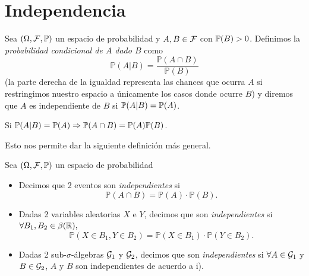 \section{Independencia}

Sea $(\Omega, \mathcal{F}, \mathbb{P})$ un espacio de probabilidad y $A,B \in \mathcal{F}$ con $\mathbb{P}(B) > 0$. Definimos la \textit{probabilidad condicional de $A$ dado $B$} como
\[ \mathbb{P}(A | B) = \frac{\mathbb{P}(A \cap B)}{\mathbb{P}(B)} \]
(la parte derecha de la igualdad representa las chances que ocurra $A$ si restringimos nuestro espacio a únicamente los casos donde ocurre $B$) y diremos que $A$ es independiente de $B$ si $\mathbb{P}(A | B) = \mathbb{P}(A)$.

\begin{remark}
	Si $\mathbb{P}(A | B) = \mathbb{P}(A) \Rightarrow \mathbb{P}(A \cap B) = \mathbb{P}(A) \mathbb{P}(B)$.
\end{remark}

Esto nos permite dar la siguiente definición más general.

\begin{definition}
	Sea $(\Omega, \mathcal{F}, \mathbb{P})$ un espacio de probabilidad
	\begin{itemize}
		\item Decimos que 2 eventos son \textit{independientes} si
		\[ \mathbb{P}(A \cap B) = \mathbb{P}(A) \cdot \mathbb{P}(B). \]

		\item Dadas 2 variables aleatorias $X$ e $Y$, decimos que son \textit{independientes} si $\forall B_{1}, B_{2} \in \beta(\mathbb{R}),$
		\[ \mathbb{P}(X \in B_{1}, Y \in B_{2}) = \mathbb{P}(X \in B_{1}) \cdot \mathbb{P}(Y \in B_{2}). \]
		
		\item Dadas 2 sub-$\sigma$-álgebras $\mathcal{G}_{1}$ y $\mathcal{G}_{2}$, decimos que son \textit{independientes} si $\forall A \in \mathcal{G}_{1}$ y $B \in \mathcal{G}_{2}$, $A$ y $B$ son independientes de acuerdo a i).
	\end{itemize}
\end{definition}

